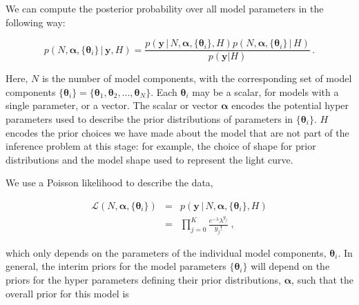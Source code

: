 \documentclass[12pt]{emulateapj}
\newcommand{\given}{\,|\,}
\newcommand{\counts}{y}
\newcommand{\pars}{\theta}
\newcommand{\mean}{\lambda}
\newcommand{\likelihood}{{\mathcal L}}
\newcommand{\Poisson}{{\mathcal P}}
\newcommand{\bg}{\mathrm{bg}}
\begin{document}
  
We can compute the posterior probability over all model parameters in the following way:

\begin{equation}
p(N, \bm{\alpha},\{\bm{\theta}_i \} \given \bm{\counts}, H) = \frac{p(\bm{\counts} \given N, \bm{\alpha}, \{\bm{\theta}_i \}, H) p(N, \bm{\alpha}, \{\bm{\theta}_i \} \given H)}{p(\bm{\counts} | H)} \, .
\end{equation}

Here, $N$ is the number of model components, with the corresponding set of model components $\{\bm{\theta}_i\} = \{ \bm{\theta}_1, \bm{\theta}_2, ..., \bm{\theta}_N \}$. Each $\bm{\theta}_i$ may be a scalar, for models with a single parameter, or a vector.
The scalar or vector $\bm{\alpha}$ encodes the potential hyper parameters used to describe the prior distributions of parameters in $\{\bm{\theta}_i\}$. $H$ encodes the prior choices we have
made about the model that are not part of the inference problem at this stage: for example, the choice of shape for prior distributions and the model shape used to represent the light curve.

We use a Poisson likelihood to describe the data,

\begin{eqnarray}
\likelihood(N, \bm{\alpha}, \{\bm{\theta}_i \}) & = & p(\bm{\counts} \given N, \bm{\alpha}, \{\bm{\theta}_i \}, H) \\ \nonumber
 &= & \prod\limits_{j=0}^{K}{ \frac{e^{-\lambda} \lambda^{y_j} }{y_j! }} \; ,
\end{eqnarray}

which only depends on the parameters of the individual model components, $\bm{\theta}_i$. In general, the interim priors for the model 
parameters $\{\bm{\theta}_i\}$ will depend on the priors for the hyper parameters defining their prior distributions, $\bm{\alpha}$, such that the
overall prior for this model is
\end{document}
